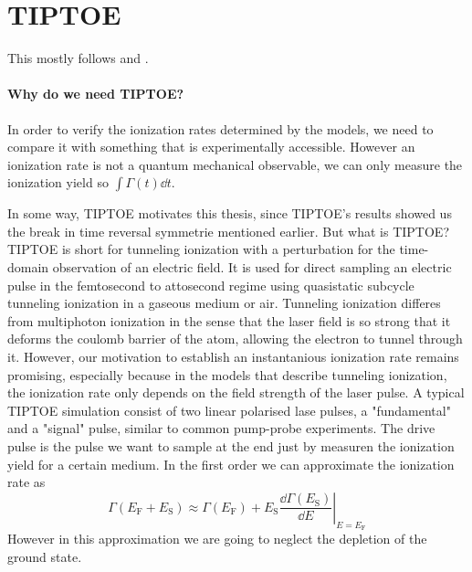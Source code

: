 \section{TIPTOE}
This mostly follows \cite{Park:18} and \cite{manorammasterthesis}.
\paragraph{Why do we need TIPTOE?} 
In order to verify the ionization rates determined by the models, we need to compare it with something that is experimentally accessible.
However an ionization rate is not a quantum mechanical observable, we can only measure the ionization yield so $\int \Gamma(t) \dd t$.

In some way, TIPTOE motivates this thesis, since TIPTOE's results showed us the break in time reversal symmetrie mentioned earlier.
But what is TIPTOE? TIPTOE \cite{Park:18} is short for tunneling ionization with a perturbation for the time-domain observation of an electric field. 
It is used for direct sampling an electric pulse in the femtosecond to attosecond regime using quasistatic subcycle tunneling ionization in a gaseous medium or air.
Tunneling ionization differes from multiphoton ionization in the sense that the laser field is so strong that it deforms the coulomb barrier of the atom, allowing the electron to tunnel through it.
However, our motivation to establish an instantanious ionization rate remains promising, especially because in the models that describe tunneling ionization, the ionization rate only depends on the field strength of the laser pulse.
A typical TIPTOE simulation consist of two linear polarised lase pulses, a "fundamental" and a "signal" pulse, similar to common pump-probe experiments. 
The drive pulse is the pulse we want to sample at the end just by measuren the ionization yield for a certain medium.
In the first order we can approximate the ionization rate as
\begin{equation*}
    \Gamma(E_{\mathrm{F}}+E_{\mathrm{S}})\approx\Gamma(E_{\mathrm{F}})+\left.E_{\mathrm{S}}\frac{\dd \Gamma(E_{\mathrm{S}})}{\dd E}\right|_{E=E_{\mathrm{F}}}
\end{equation*}
However in this approximation we are going to neglect the depletion of the ground state. 
